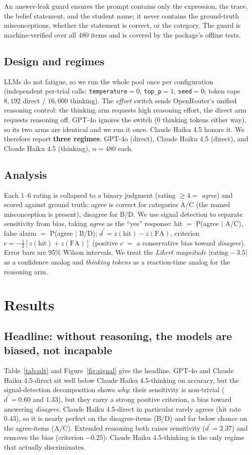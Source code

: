 \documentclass[11pt]{article}
\newcommand{\dprime}{d^{\prime}}
\newcommand{\haiku}{Claude Haiku 4.5}
\newcommand{\gpt}{GPT-4o}
\begin{document}
An answer-leak guard ensures the prompt contains only the expression, the trace, the belief
statement, and the student name; it never contains the ground-truth misconceptions, whether the
statement is correct, or the category. The guard is machine-verified over all $480$ items and
is covered by the package's offline tests.

\subsection{Design and regimes}
LLMs do not fatigue, so we run the whole pool once per configuration (independent per-trial
calls; \texttt{temperature}$=0$, \texttt{top\_p}$=1$, \texttt{seed}$=0$; token caps $8{,}192$
direct / $16{,}000$ thinking). The \emph{effort} switch sends OpenRouter's unified reasoning
control: the thinking arm requests high reasoning effort, the direct arm requests reasoning
off. \gpt{} ignores the switch (0 thinking tokens either way), so its two arms are identical
and we run it once. \haiku{} honors it. We therefore report \textbf{three regimes}: \gpt{}
(direct), \haiku{} (direct), and \haiku{} (thinking), $n = 480$ each.

\subsection{Analysis}
Each $1$--$6$ rating is collapsed to a binary judgment (rating $\ge 4 =$ \emph{agree}) and
scored against ground truth: agree is correct for categories A/C (the named misconception is
present), disagree for B/D. We use signal detection to separate sensitivity from bias, taking
\emph{agree} as the ``yes'' response: hit $=$ P(agree $\mid$ A/C), false alarm $=$ P(agree
$\mid$ B/D); $\dprime = z(\text{hit}) - z(\text{FA})$, criterion $c = -\tfrac{1}{2}[z(\text{hit})
+ z(\text{FA})]$ (positive $c$ $=$ a conservative bias toward \emph{disagree}). Error bars are
$95\%$ Wilson intervals. We treat the \emph{Likert magnitude} $|\text{rating} - 3.5|$ as a
confidence analog and \emph{thinking tokens} as a reaction-time analog for the reasoning arm.

\section{Results}

\subsection{Headline: without reasoning, the models are biased, not incapable}
Table~\ref{tab:sdt} and Figure~\ref{fig:signal} give the headline. \gpt{} and \haiku{}-direct
sit well below \haiku{}-thinking on accuracy, but the signal-detection decomposition shows
\emph{why}: their sensitivity is non-trivial ($\dprime = 0.60$ and $1.33$), but they carry a
strong positive criterion, a bias toward answering \emph{disagree}. \haiku{}-direct in
particular rarely agrees (hit rate $0.43$), so it is nearly perfect on the disagree-items
(B/D) and far below chance on the agree-items (A/C). Extended reasoning both raises sensitivity
($\dprime = 2.37$) and removes the bias (criterion $-0.25$): \haiku{}-thinking is the only
regime that actually discriminates.
\end{document}
